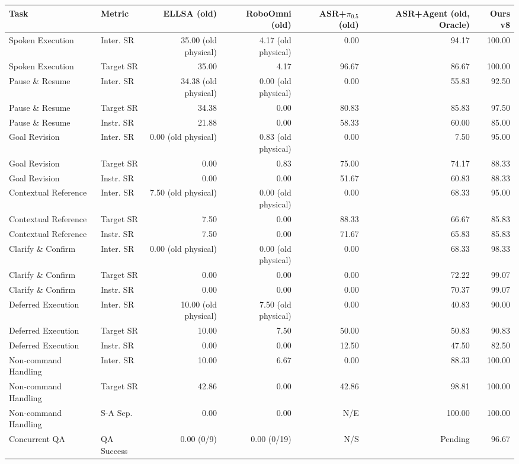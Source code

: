 \begin{tabular}{llrrrrr}
\hline
Task & Metric & ELLSA (old) & RoboOmni (old) & ASR+$\pi_{0.5}$ (old) & ASR+Agent (old, Oracle) & Ours v8 \\
\hline
Spoken Execution & Inter. SR & 35.00 (old physical) & 4.17 (old physical) & 0.00 & 94.17 & 100.00 \\
Spoken Execution & Target SR & 35.00 & 4.17 & 96.67 & 86.67 & 100.00 \\
Pause \& Resume & Inter. SR & 34.38 (old physical) & 0.00 (old physical) & 0.00 & 55.83 & 92.50 \\
Pause \& Resume & Target SR & 34.38 & 0.00 & 80.83 & 85.83 & 97.50 \\
Pause \& Resume & Instr. SR & 21.88 & 0.00 & 58.33 & 60.00 & 85.00 \\
Goal Revision & Inter. SR & 0.00 (old physical) & 0.83 (old physical) & 0.00 & 7.50 & 95.00 \\
Goal Revision & Target SR & 0.00 & 0.83 & 75.00 & 74.17 & 88.33 \\
Goal Revision & Instr. SR & 0.00 & 0.00 & 51.67 & 60.83 & 88.33 \\
Contextual Reference & Inter. SR & 7.50 (old physical) & 0.00 (old physical) & 0.00 & 68.33 & 95.00 \\
Contextual Reference & Target SR & 7.50 & 0.00 & 88.33 & 66.67 & 85.83 \\
Contextual Reference & Instr. SR & 7.50 & 0.00 & 71.67 & 65.83 & 85.83 \\
Clarify \& Confirm & Inter. SR & 0.00 (old physical) & 0.00 (old physical) & 0.00 & 68.33 & 98.33 \\
Clarify \& Confirm & Target SR & 0.00 & 0.00 & 0.00 & 72.22 & 99.07 \\
Clarify \& Confirm & Instr. SR & 0.00 & 0.00 & 0.00 & 70.37 & 99.07 \\
Deferred Execution & Inter. SR & 10.00 (old physical) & 7.50 (old physical) & 0.00 & 40.83 & 90.00 \\
Deferred Execution & Target SR & 10.00 & 7.50 & 50.00 & 50.83 & 90.83 \\
Deferred Execution & Instr. SR & 0.00 & 0.00 & 12.50 & 47.50 & 82.50 \\
Non-command Handling & Inter. SR & 10.00 & 6.67 & 0.00 & 88.33 & 100.00 \\
Non-command Handling & Target SR & 42.86 & 0.00 & 42.86 & 98.81 & 100.00 \\
Non-command Handling & S-A Sep. & 0.00 & 0.00 & N/E & 100.00 & 100.00 \\
Concurrent QA & QA Success & 0.00 (0/9) & 0.00 (0/19) & N/S & Pending & 96.67 \\
\hline
\end{tabular}
